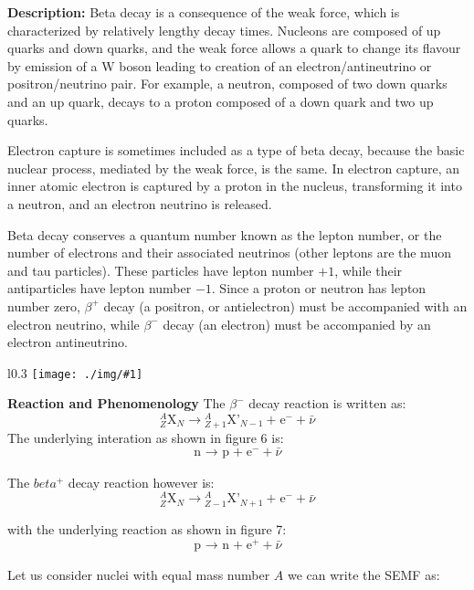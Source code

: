 \documentclass[10pt,a4paper]{article}
\newcounter{figurecounter}
\newcommand{\imgl}[3]{
    \begin{wrapfigure}{l}{#2\textwidth}
        \centering
        \captionsetup{justification=centering,margin=0.5cm,labelformat=empty}
        \texttt{[image: ./img/\#1]}
        \label{figure}
        \caption{\small \textbf{fig: \thefigurecounter} -- \textcolor{darkliver}{#3}}
    \end{wrapfigure}
    \addtocounter{figurecounter}{1}}
\newcommand{\ch}[5]{{}^{#2}_{#3}\!\text{#1}^{#4}_{#5}}
\begin{document}
\textbf{Description:} 
Beta decay is a consequence of the weak force, which is characterized by relatively lengthy decay times. Nucleons are composed of up quarks and down quarks, and the weak force allows a quark to change its flavour by emission of a W boson leading to creation of an electron/antineutrino or positron/neutrino pair. For example, a neutron, composed of two down quarks and an up quark, decays to a proton composed of a down quark and two up quarks.

Electron capture is sometimes included as a type of beta decay, because the basic nuclear process, mediated by the weak force, is the same. In electron capture, an inner atomic electron is captured by a proton in the nucleus, transforming it into a neutron, and an electron neutrino is released.

Beta decay conserves a quantum number known as the lepton number, or the number of electrons and their associated neutrinos (other leptons are the muon and tau particles). These particles have lepton number $+1$, while their antiparticles have lepton number $-1$. Since a proton or neutron has lepton number zero, $\beta^+$ decay (a positron, or antielectron) must be accompanied with an electron neutrino, while $\beta^-$ decay (an electron) must be accompanied by an electron antineutrino.

\imgl{betapositive}{0.3}{Feynman digram of the $\beta^+$ decay}
\textbf{Reaction and Phenomenology}
The $\beta^-$ decay reaction is written as:
\begin{equation}
    \ch{X}{A}{Z}{}{N} \rightarrow \ch{X'}{A}{Z+1}{}{N-1} + \ch{e}{}{}{-}{} + \bar\nu
\end{equation}
The underlying interation as shown in figure 6 is:
\begin{equation}
    \ch{n}{}{}{}{} \rightarrow \ch{p}{}{}{}{} + \ch{e}{}{}{-}{} + \bar\nu
\end{equation} 

The $beta^+$ decay reaction however is:
\begin{equation}
    \ch{X}{A}{Z}{}{N} \rightarrow \ch{X'}{A}{Z-1}{}{N+1} + \ch{e}{}{}{-}{} + \bar\nu
\end{equation}

with the underlying reaction as shown in figure 7:
\begin{equation}
    \ch{p}{}{}{}{} \rightarrow \ch{n}{}{}{}{} + \ch{e}{}{}{+}{} + \bar\nu
\end{equation} 

Let us consider nuclei with equal mass number $A$ we can write the SEMF as:
\end{document}
